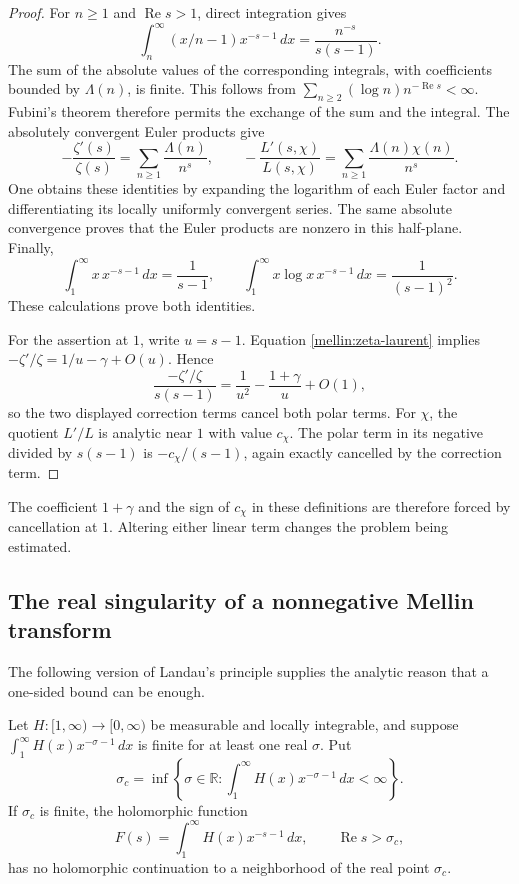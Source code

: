 \begin{proof}
For $n\geq1$ and $\operatorname{Re}s>1$, direct integration gives
\[
 \int_n^\infty(x/n-1)x^{-s-1}\,dx
   =\frac{n^{-s}}{s(s-1)}.
\]
The sum of the absolute values of the corresponding integrals, with
coefficients bounded by $\Lambda(n)$, is finite.  This follows from
$\sum_{n\geq2}(\log n)n^{-\operatorname{Re}s}<\infty$.
Fubini's theorem therefore permits the exchange of the sum and the
integral.  The absolutely convergent Euler products give
\[
 -\frac{\zeta'(s)}{\zeta(s)}
   =\sum_{n\geq1}\frac{\Lambda(n)}{n^s},\qquad
 -\frac{L'(s,\chi)}{L(s,\chi)}
   =\sum_{n\geq1}\frac{\Lambda(n)\chi(n)}{n^s}.
\]
One obtains these identities by expanding the logarithm of each Euler
factor and differentiating its locally uniformly convergent series.
The same absolute convergence proves that the Euler products are
nonzero in this half-plane.
Finally,
\[
 \int_1^\infty x\,x^{-s-1}\,dx=\frac1{s-1},\qquad
 \int_1^\infty x\log x\,x^{-s-1}\,dx=\frac1{(s-1)^2}.
\]
These calculations prove both identities.

For the assertion at $1$, write $u=s-1$.  Equation
\eqref{mellin:zeta-laurent} implies
$-\zeta'/\zeta=1/u-\gamma+O(u)$.  Hence
\[
 \frac{-\zeta'/\zeta}{s(s-1)}
   =\frac1{u^2}-\frac{1+\gamma}{u}+O(1),
\]
so the two displayed correction terms cancel both polar terms.
For $\chi$, the quotient $L'/L$ is analytic near $1$ with value
$c_\chi$.  The polar term in its negative divided by $s(s-1)$ is
$-c_\chi/(s-1)$, again exactly cancelled by the correction term.
\end{proof}

The coefficient $1+\gamma$ and the sign of $c_\chi$ in these definitions
are therefore forced by cancellation at $1$.  Altering either linear
term changes the problem being estimated.

\subsection{The real singularity of a nonnegative Mellin transform}

The following version of Landau's principle supplies the analytic
reason that a one-sided bound can be enough.

\begin{lemma}\label{mellin:landau}
Let $H:[1,\infty)\to[0,\infty)$ be measurable and locally integrable,
and suppose $\int_1^\infty H(x)x^{-\sigma-1}\,dx$ is finite for at least
one real $\sigma$.  Put
\[
 \sigma_c=\inf\left\{\sigma\in\mathbb R:
       \int_1^\infty H(x)x^{-\sigma-1}\,dx<\infty\right\}.
\]
If $\sigma_c$ is finite, the holomorphic function
\[
 F(s)=\int_1^\infty H(x)x^{-s-1}\,dx,
       \qquad \operatorname{Re}s>\sigma_c,
\]
has no holomorphic continuation to a neighborhood of the real point
$\sigma_c$.
\end{lemma}

